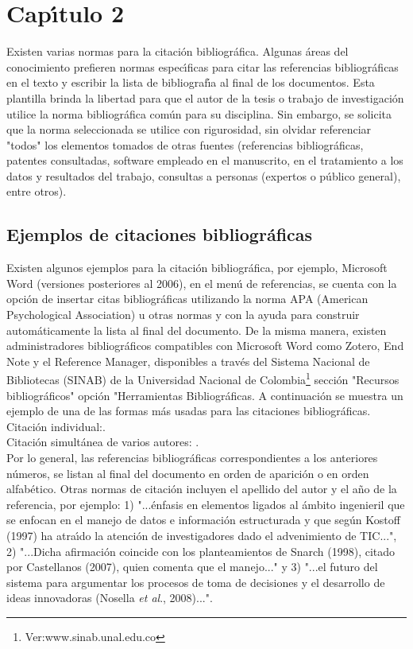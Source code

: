 \chapter{Cap\'{\i}tulo 2}
Existen varias normas para la citaci\'{o}n bibliogr\'{a}fica. Algunas \'{a}reas del conocimiento prefieren normas espec\'{\i}ficas para citar las referencias bibliogr\'{a}ficas en el texto y escribir la lista de bibliograf\'{\i}a al final de los documentos. Esta plantilla brinda la libertad para que el autor de la tesis  o trabajo de investigaci\'{o}n utilice la norma bibliogr\'{a}fica com\'{u}n para su disciplina. Sin embargo, se solicita que la norma seleccionada se utilice con rigurosidad, sin olvidar referenciar "todos" los elementos tomados de otras fuentes (referencias bibliogr\'{a}ficas, patentes consultadas, software empleado en el manuscrito, en el tratamiento a los datos y resultados del trabajo, consultas a personas (expertos o p\'{u}blico general), entre otros).\\

\section{Ejemplos de citaciones bibliogr\'{a}ficas}
Existen algunos ejemplos para la citaci\'{o}n bibliogr\'{a}fica, por ejemplo, Microsoft Word (versiones posteriores al 2006), en el  men\'{u} de referencias, se cuenta con la opci\'{o}n de insertar citas bibliogr\'{a}ficas utilizando la norma APA (American Psychological Association) u otras normas y con la ayuda para construir autom\'{a}ticamente la lista al final del documento. De la misma manera, existen administradores bibliogr\'{a}ficos compatibles con Microsoft Word como Zotero, End Note y el Reference Manager,  disponibles a trav\'{e}s del Sistema Nacional de Bibliotecas (SINAB) de la Universidad Nacional de Colombia\footnote{Ver:www.sinab.unal.edu.co } secci\'{o}n "Recursos bibliogr\'{a}ficos" opci\'{o}n "Herramientas Bibliogr\'{a}ficas. A continuaci\'{o}n se muestra un ejemplo de una de las formas m\'{a}s usadas para las citaciones bibliogr\'{a}ficas.\\

Citaci\'{o}n individual:\cite{AG01}.\\
Citaci\'{o}n simult\'{a}nea de varios autores:
\cite{AG12,AG52,AG70,AG08a,AG09a,AG36a,AG01i}.\\

Por lo general, las referencias bibliogr\'{a}ficas correspondientes a los anteriores n\'{u}meros, se listan al final del documento en orden de aparici\'{o}n o en orden alfab\'{e}tico. Otras normas de citaci\'{o}n incluyen el apellido del autor y el a\~{n}o de la referencia, por ejemplo: 1) "...\'{e}nfasis en elementos ligados al \'{a}mbito ingenieril que se enfocan en el manejo de datos e informaci\'{o}n estructurada y que seg\'{u}n Kostoff (1997) ha atra\'{\i}do la atenci\'{o}n de investigadores dado el advenimiento de TIC...", 2) "...Dicha afirmaci\'{o}n coincide con los planteamientos de Snarch (1998), citado por Castellanos (2007), quien comenta que el manejo..." y 3) "...el futuro del sistema para argumentar los procesos de toma de decisiones y el desarrollo de ideas innovadoras (Nosella \textsl{et al}., 2008)...".\\

